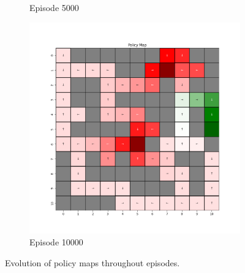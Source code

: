 \documentclass{assignment}
\begin{document}
\begin{figure}[H]
\begin{subfigure}{0.3\textwidth}
    \caption{Episode 5000}
    \end{subfigure}\hfill
    \begin{subfigure}{0.3\textwidth}
        \includegraphics[width=\textwidth]{figures/policy_td/epsilon_sweep/policy_alpha_0.1_gamma_0.95_epsilon_0.8_iteration_10000.png}
    \caption{Episode 10000}
    \end{subfigure}
    \caption{Evolution of policy maps throughout episodes.}
    \label{fig:epsilon_0.8_td_learning_policy}
\end{figure}
\end{document}
